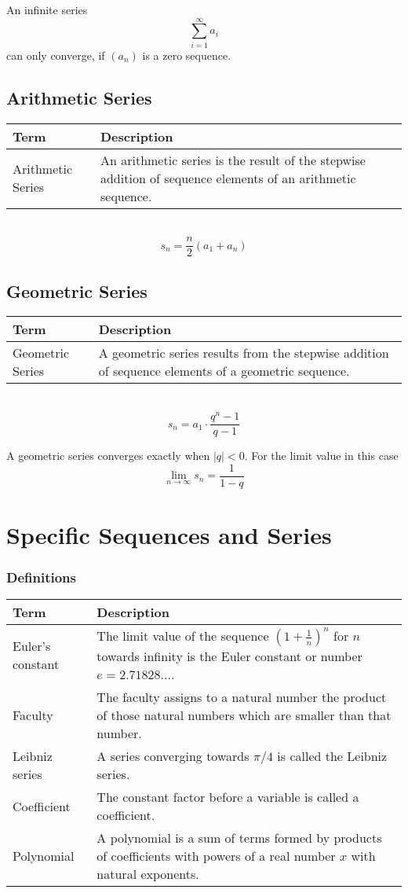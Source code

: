 \documentclass{book}
\begin{document}
An infinite series
\[
  \sum_{i=1}^{\infty} a_{i}
\]
can only converge, if $(a_{n})$ is a zero sequence.

\subsection{Arithmetic Series}
\begin{tabular}{p{3cm}p{10.5cm}}
  \toprule
  \textbf{Term} & \textbf{Description} \\
  \midrule
  Arithmetic Series & An arithmetic series is the result of the stepwise addition of sequence elements of an arithmetic sequence.\\
  \bottomrule
\end{tabular}\\

\[
  s_{n} = \frac{n}{2}\left(a_{1}+a_{n}\right)
\]

\subsection{Geometric Series}
\begin{tabular}{p{3cm}p{10.5cm}}
  \toprule
  \textbf{Term} & \textbf{Description} \\
  \midrule
  Geometric Series & A geometric series results from the stepwise addition of sequence elements of a geometric sequence.\\
  \bottomrule
\end{tabular}\\

\[
  s_{n} = a_{1}\cdot\frac{q^{n}-1}{q-1}
\]

A geometric series converges exactly when $|q|<0$. For the limit value in this case
\[
  \lim\limits_{n\to\infty}s_{n} = \frac{1}{1-q}
\]

\section{Specific Sequences and Series}
\subsubsection{Definitions}
\begin{tabular}{p{3cm}p{10.5cm}}
  \toprule
  \textbf{Term} & \textbf{Description} \\
  \midrule
  Euler's constant & The limit value of the sequence $\left(1+\frac{1}{n}\right)^{n}$ for $n$ towards infinity is the Euler constant or number $e = 2.71828...$.\\
  \midrule
  Faculty & The faculty assigns to a natural number the product of those natural numbers which are smaller than that number.\\
  \midrule
  Leibniz series & A series converging towards $\pi/4$ is called the Leibniz series.\\
  \midrule
  Coefficient & The constant factor before a variable is called a coefficient.\\
  \midrule
  Polynomial & A polynomial is a sum of terms formed by products of coefficients with powers of a real number $x$ with natural exponents.\\ 
  \bottomrule
\end{tabular}
\end{document}
